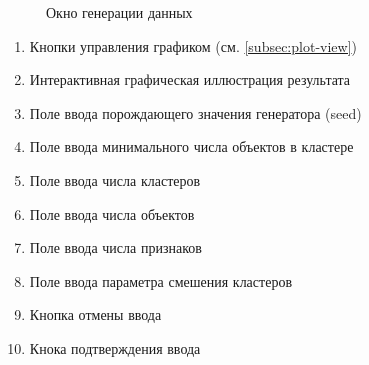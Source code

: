 \documentclass[12pt,tikz]{instruction}
\begin{document}
\begin{figure}[H]
	\centering
	\caption{Окно генерации данных}
	\label{fig:gen-data-dialog}
\end{figure}


\begin{enumerate}
	\item Кнопки управления графиком (см. \ref{subsec:plot-view})
	\item Интерактивная графическая иллюстрация результата
	\item Поле ввода порождающего значения генератора (seed)
	\item Поле ввода минимального числа объектов в кластере
	\item Поле ввода числа кластеров
	\item Поле ввода числа объектов 
	\item Поле ввода числа признаков
	\item Поле ввода параметра смешения кластеров
	\item Кнопка отмены ввода
	\item Кнока подтверждения ввода
\end{enumerate}
\end{document}
